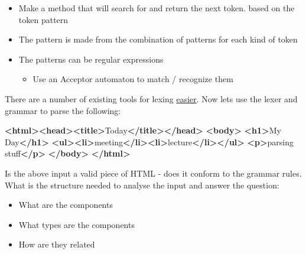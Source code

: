 \documentclass[
]{book}
\newenvironment{Shaded}{\begin{snugshade}}{\end{snugshade}}
\newcommand{\KeywordTok}[1]{\textcolor[rgb]{0.13,0.29,0.53}{\textbf{#1}}}
\newcommand{\NormalTok}[1]{#1}
\providecommand{\tightlist}{%
  \setlength{\itemsep}{0pt}\setlength{\parskip}{0pt}}
\begin{document}
\begin{itemize}
\tightlist
\item
  Make a method that will search for and return the next token. based on the token pattern
\item
  The pattern is made from the combination of patterns for each kind of token
\item
  The patterns can be regular expressions

  \begin{itemize}
  \tightlist
  \item
    Use an Acceptor automaton to match / recognize them
  \end{itemize}
\end{itemize}

There are a number of existing tools for lexing \href{http://en.wikipedia.org/wiki/Lexical_analysis}{easier}. Now lets use the lexer and grammar to parse the following:

\begin{Shaded}
\begin{Highlighting}[]
\KeywordTok{\textless{}html\textgreater{}\textless{}head\textgreater{}\textless{}title\textgreater{}}\NormalTok{Today}\KeywordTok{\textless{}/title\textgreater{}\textless{}/head\textgreater{}}
\KeywordTok{\textless{}body\textgreater{}} \KeywordTok{\textless{}h1\textgreater{}}\NormalTok{My Day}\KeywordTok{\textless{}/h1\textgreater{}}
\KeywordTok{\textless{}ul\textgreater{}\textless{}li\textgreater{}}\NormalTok{meeting}\KeywordTok{\textless{}/li\textgreater{}\textless{}li\textgreater{}}\NormalTok{lecture}\KeywordTok{\textless{}/li\textgreater{}\textless{}/ul\textgreater{}}
\KeywordTok{\textless{}p\textgreater{}}\NormalTok{parsing stuff}\KeywordTok{\textless{}/p\textgreater{}}
\KeywordTok{\textless{}/body\textgreater{}}
\KeywordTok{\textless{}/html\textgreater{}}
\end{Highlighting}
\end{Shaded}

Is the above input a valid piece of HTML - does it conform to the grammar rules. What is the structure needed to analyse the input and answer the question:

\begin{itemize}
\tightlist
\item
  What are the components
\item
  What types are the components
\item
  How are they related
\end{itemize}
\end{document}
